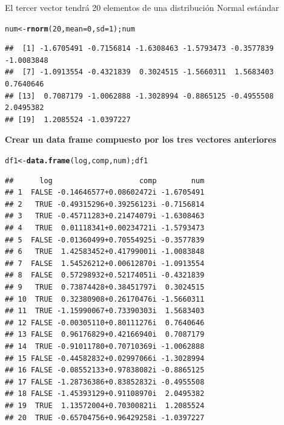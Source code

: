 \documentclass[12pt,letterpaper]{article}\usepackage[]{graphicx}\usepackage[]{color}
\makeatletter
\newcommand{\hlnum}[1]{\textcolor[rgb]{0.686,0.059,0.569}{#1}}%
\newcommand{\hlstd}[1]{\textcolor[rgb]{0.345,0.345,0.345}{#1}}%
\newcommand{\hlkwb}[1]{\textcolor[rgb]{0.69,0.353,0.396}{#1}}%
\newcommand{\hlkwc}[1]{\textcolor[rgb]{0.333,0.667,0.333}{#1}}%
\newcommand{\hlkwd}[1]{\textcolor[rgb]{0.737,0.353,0.396}{\textbf{#1}}}%
\newenvironment{kframe}{%
 \def\at@end@of@kframe{}%
 \ifinner\ifhmode%
  \def\at@end@of@kframe{\end{minipage}}%
  \begin{minipage}{\columnwidth}%
 \fi\fi%
 \def\FrameCommand##1{\hskip\@totalleftmargin \hskip-\fboxsep
 \colorbox{shadecolor}{##1}\hskip-\fboxsep
     \hskip-\linewidth \hskip-\@totalleftmargin \hskip\columnwidth}%
 \MakeFramed {\advance\hsize-\width
   \@totalleftmargin\z@ \linewidth\hsize
   \@setminipage}}%
 {\par\unskip\endMakeFramed%
 \at@end@of@kframe}
\newenvironment{knitrout}{}{} %
\makeatother
\begin{document}
El tercer vector tendr\'a 20 elementos de una distribuci\'on Normal est\'andar 
\begin{knitrout}
\color{fgcolor}\begin{kframe}
\begin{alltt}
\hlstd{num} \hlkwb{<-} \hlkwd{rnorm}\hlstd{(}\hlnum{20}\hlstd{,} \hlkwc{mean}\hlstd{=}\hlnum{0}\hlstd{,} \hlkwc{sd}\hlstd{=}\hlnum{1}\hlstd{); num}
\end{alltt}
\begin{verbatim}
##  [1] -1.6705491 -0.7156814 -1.6308463 -1.5793473 -0.3577839 -1.0083848
##  [7] -1.0913554 -0.4321839  0.3024515 -1.5660311  1.5683403  0.7640646
## [13]  0.7087179 -1.0062888 -1.3028994 -0.8865125 -0.4955508  2.0495382
## [19]  1.2085524 -1.0397227
\end{verbatim}
\end{kframe}
\end{knitrout}

\textbf{Crear un data frame compuesto por los tres vectores anteriores}
\begin{knitrout}
\color{fgcolor}\begin{kframe}
\begin{alltt}
\hlstd{df1} \hlkwb{<-} \hlkwd{data.frame}\hlstd{(log, comp, num); df1}
\end{alltt}
\begin{verbatim}
##      log                    comp        num
## 1  FALSE -0.14646577+0.08602472i -1.6705491
## 2   TRUE -0.49315296+0.39256123i -0.7156814
## 3   TRUE -0.45711283+0.21474079i -1.6308463
## 4   TRUE  0.01118341+0.00234721i -1.5793473
## 5  FALSE -0.01360499+0.70554925i -0.3577839
## 6   TRUE  1.42583452+0.41799001i -1.0083848
## 7  FALSE  1.54526212+0.00612870i -1.0913554
## 8  FALSE  0.57298932+0.52174051i -0.4321839
## 9   TRUE  0.73874428+0.38451797i  0.3024515
## 10  TRUE  0.32380908+0.26170476i -1.5660311
## 11  TRUE -1.15990067+0.73390303i  1.5683403
## 12 FALSE -0.00305110+0.80111276i  0.7640646
## 13 FALSE  0.96176829+0.42166940i  0.7087179
## 14  TRUE -0.91011780+0.70710369i -1.0062888
## 15 FALSE -0.44582832+0.02997066i -1.3028994
## 16 FALSE -0.08552133+0.97838082i -0.8865125
## 17 FALSE -1.28736386+0.83852832i -0.4955508
## 18 FALSE -1.45393129+0.91108970i  2.0495382
## 19  TRUE  1.13572004+0.70300821i  1.2085524
## 20  TRUE -0.65704756+0.96429258i -1.0397227
\end{verbatim}
\end{kframe}
\end{knitrout}
\end{document}
